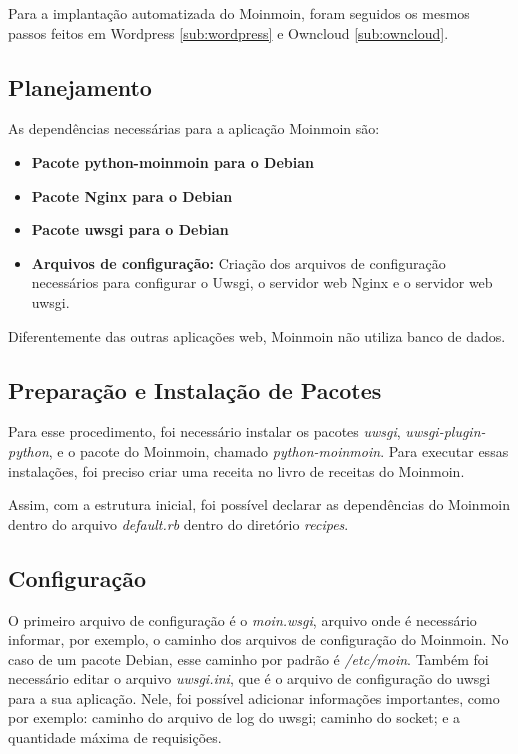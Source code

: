 Para a implantação automatizada do Moinmoin, foram seguidos os mesmos passos
feitos em Wordpress \ref{sub:wordpress} e Owncloud \ref{sub:owncloud}.

\subsection{Planejamento}

As dependências necessárias para a aplicação Moinmoin são:

\begin{itemize}
   \item \textbf{Pacote python-moinmoin para o Debian}
   \item \textbf{Pacote Nginx para o Debian}
   \item \textbf{Pacote uwsgi para o Debian}
   \item \textbf{Arquivos de configuração:} Criação dos arquivos de configuração
   necessários para configurar o Uwsgi, o servidor web Nginx e o servidor web
uwsgi.
\end{itemize}

Diferentemente das outras aplicações web, Moinmoin não utiliza banco de dados.

\subsection{Preparação e Instalação de Pacotes}

Para esse procedimento, foi necessário instalar os pacotes \textit{uwsgi},
\textit{uwsgi-plugin-python}, e o pacote do Moinmoin, chamado \textit{python-moinmoin}.
Para executar essas instalações, foi preciso criar uma receita no livro de receitas
do Moinmoin.

Assim, com a estrutura inicial, foi possível declarar as dependências do Moinmoin
dentro do arquivo \textit{default.rb} dentro do diretório \textit{recipes}.

\subsection{Configuração}

O primeiro arquivo de configuração é o \textit{moin.wsgi}, arquivo onde é necessário
informar, por exemplo, o caminho dos arquivos de configuração do Moinmoin. No caso
de um pacote Debian, esse caminho por padrão é  \textit{/etc/moin}. Também foi necessário 
editar o arquivo \textit{uwsgi.ini}, que é o arquivo de configuração
do uwsgi para a sua aplicação. Nele, foi possível adicionar informações importantes, como
por exemplo: caminho do arquivo de log do uwsgi; caminho do socket;
e a quantidade máxima de requisições.

